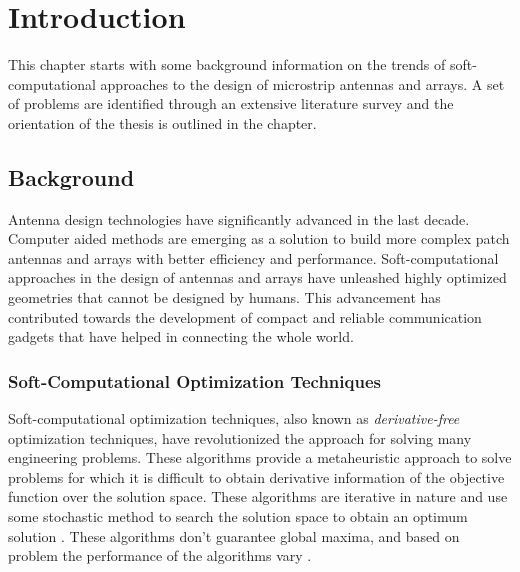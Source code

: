 \chapter{Introduction}
\label{chap:chap1}
\def\baselinestretch{1.66}
This chapter starts with some background information on the trends of soft-computational approaches to the design of microstrip antennas and arrays. A set of problems are identified through an extensive literature survey and the orientation of the thesis is outlined in the chapter.

\section{Background}
Antenna design technologies have significantly advanced in the last decade. Computer aided methods are emerging as a solution to build more complex patch antennas and arrays with better efficiency and performance. Soft-computational approaches in the design of antennas and arrays have unleashed highly optimized geometries that cannot be designed by humans. This advancement has contributed towards the development of compact and reliable communication gadgets that have helped in connecting the whole world.

\subsection{Soft-Computational Optimization Techniques}
Soft-computational optimization techniques, also known as \emph{derivative-free} optimization techniques, have revolutionized the approach for solving many engineering problems. These algorithms provide a metaheuristic approach to solve problems for which it is difficult to obtain derivative information of the objective function over the solution space. These algorithms are iterative in nature and use some stochastic method to search the solution space to obtain an optimum solution \cite {softCompBook}. These algorithms don't guarantee global maxima, and based on problem the performance of the algorithms vary \cite{compCAD4Arry}.

